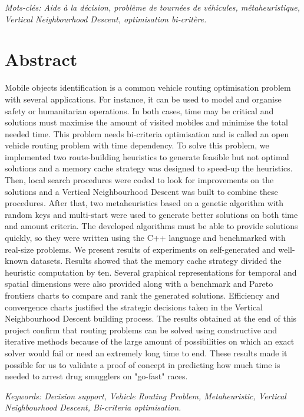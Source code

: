 \emph{Mots-clés: Aide à la décision, problème de tournées de véhicules, métaheuristique, Vertical Neighbourhood Descent, optimisation bi-critère.}

\newpage
\section*{Abstract}

Mobile objects identification is a common vehicle routing optimisation problem with several applications. For instance, it can be used to model and organise safety or humanitarian operations. In both cases, time may be critical and solutions must maximise the amount of visited mobiles and minimise the total needed time. This problem needs bi-criteria optimisation and is called an open vehicle routing problem with time dependency. To solve this problem, we implemented two route-building heuristics to generate feasible but not optimal solutions and a memory cache strategy was designed to speed-up the heuristics. Then, local search procedures were coded to look for improvements on the solutions and a Vertical Neighbourhood Descent was built to combine these procedures. After that, two metaheuristics based on a genetic algorithm with random keys and multi-start were used to generate better solutions on both time and amount criteria. The developed algorithms must be able to provide solutions quickly, so they were written using the C++ language and benchmarked with real-size problems. We present results of experiments on self-generated and well-known datasets. Results showed that the memory cache strategy divided the heuristic computation by ten. Several graphical representations for temporal and spatial dimensions were also provided along with a benchmark and Pareto frontiers charts to compare and rank the generated solutions. Efficiency and convergence charts justified the strategic decisions taken in the Vertical Neighbourhood Descent building process. The results obtained at the end of this project confirm that routing problems can be solved using constructive and iterative methods because of the large amount of possibilities on which an exact solver would fail or need an extremely long time to end. These results made it possible for us to validate a proof of concept in predicting how much time is needed to arrest drug smugglers on "go-fast" races.

\emph{Keywords: Decision support, Vehicle Routing Problem, Metaheuristic, Vertical Neighbourhood Descent, Bi-criteria optimisation.}
